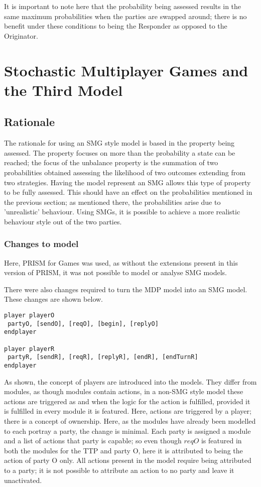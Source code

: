 \documentclass{l4proj}
\begin{document}
It is important to note here that the probability being assessed results in the same maximum probabilities when the parties are swapped around; there is no benefit under these conditions to being the Responder as opposed to the Originator.

\chapter{Stochastic Multiplayer Games and the Third Model}

\section{Rationale}

The rationale for using an SMG style model is based in the property being assessed. The property focuses on more than the probability a state can be reached; the focus of the unbalance property is the summation of two probabilities obtained assessing the likelihood of two outcomes extending from two strategies. Having the model represent an SMG allows this type of property to be fully assessed.
This should have an effect on the probabilities mentioned in the previous section; as mentioned there, the probabilities arise due to 'unrealistic' behaviour. Using SMGs, it is possible to achieve a more realistic behaviour style out of the two parties.

\subsection{Changes to model}

Here, PRISM for Games \cite{chen2013prism} was used, as without the extensions present in this version of PRISM, it was not possible to model or analyse SMG models.

There were also changes required to turn the MDP model into an SMG model. These changes are shown below.
\begin{lstlisting}
player playerO
 partyO, [sendO], [reqO], [begin], [replyO]
endplayer

player playerR
 partyR, [sendR], [reqR], [replyR], [endR], [endTurnR]
endplayer
\end{lstlisting}

As shown, the concept of players are introduced into the models. They differ from modules, as though modules contain actions, in a non-SMG style model these actions are triggered as and when the logic for the action is fulfilled, provided it is fulfilled in every module it is featured. Here, actions are triggered by a player; there is a concept of ownership. Here, as the modules have already been modelled to each portray a party, the change is minimal. Each party is assigned a module and a list of actions that party is capable; so even though $reqO$ is featured in both the modules for the TTP and party O, here it is attributed to being the action of party O only. All actions present in the model require being attributed to a party; it is not possible to attribute an action to no party and leave it unactivated.
\end{document}
